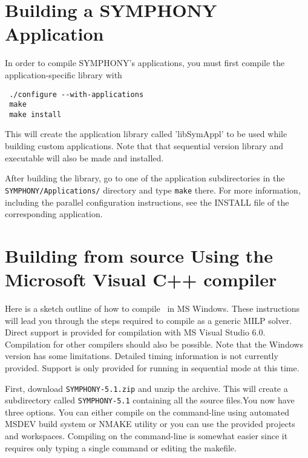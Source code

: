 \section{Building a SYMPHONY Application}
\label{build_appl}
In order to compile SYMPHONY's applications, you must first compile the 
application-specific library with
{\color{Brown}
\begin{verbatim}
 ./configure --with-applications 
 make 
 make install
\end{verbatim}
}
This will create the application library called 'libSymAppl' to be used while
building custom applications. Note that that sequential version library and
executable will also be made and installed.

After building the library, go to one of the application subdirectories in the
\texttt{SYMPHONY/Applications/} directory and type \texttt{make} there. For
more information, including the parallel configuration instructions, see the
INSTALL file of the corresponding application.

\section{Building from source Using the Microsoft Visual C++ compiler}
\label{getting_started_windows}

Here is a sketch outline of how to compile \BB\ in MS Windows.
These instructions will lead you through the steps required to compile
\BB as a generic MILP solver. Direct support
is provided for compilation with MS Visual Studio 6.0. Compilation for other
compilers should also be possible. Note that the Windows version has some
limitations. Detailed timing information is not currently provided. Support is
only provided for running in sequential mode at this time.

First, download \texttt{SYMPHONY-5.1.zip} and unzip the archive. This will
create a subdirectory called \texttt{SYMPHONY-5.1} containing all the source
files.You now 
have three options. You can either compile on the command-line using automated 
MSDEV build system or NMAKE utility or you can use the provided projects and 
workspaces. Compiling on the command-line is somewhat easier since it requires 
only typing a single command or editing the makefile. 

